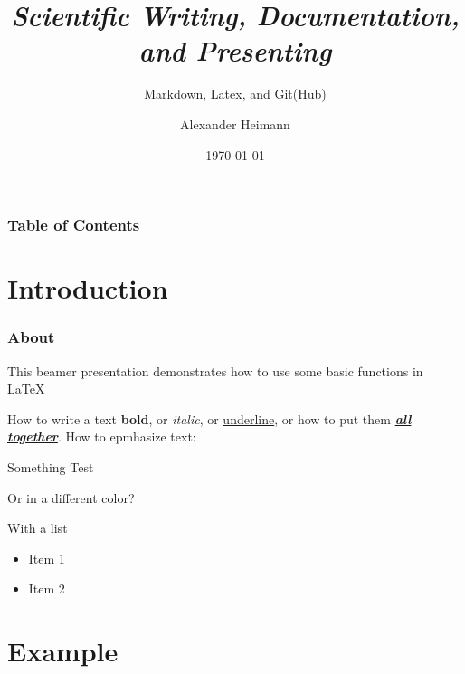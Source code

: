 \documentclass[aspectratio=169]{beamer}
\title[Template]{\emph{Scientific Writing, Documentation, and Presenting}}
\subtitle[]{Markdown, Latex, and Git(Hub)}
\author[Alexander Heimann]{Alexander Heimann}
\institute[]{NCKU - Department of Geomatics}
\date[\today]{\today}
\begin{document}
\frame{\titlepage}      %

\begin{frame}           %
    \frametitle{Table of Contents}
    \tableofcontents
\end{frame}


\section{Introduction}

\begin{frame}
    \frametitle{About}
    This beamer presentation demonstrates how to use some basic functions in \LaTeX

    How to write a text \textbf{bold}, or \textit{italic}, or \underline{underline}, or how to put them \textbf{\textit{\underline{all together}}}.
    How to epmhasize text:
    \begin{block}{Something}
        Test
    \end{block}
    Or in a different color?\\
    \begin{alertblock}{With a list}
        \begin{itemize}
            \item Item 1
            \item Item 2
        \end{itemize}
    \end{alertblock}
\end{frame}

\section{Example}
\end{document}
